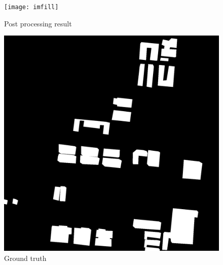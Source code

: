 \documentclass[]{IEEEtran}
\begin{document}
\begin{figure}
	\begin{minipage}[t]{0.5\linewidth}
		\centering
		\texttt{[image: imfill]}
		\caption{Post processing result}
		\label{fig:imfill}
	\end{minipage}%
	\begin{minipage}[t]{0.5\linewidth}
		\centering
		\includegraphics[width=0.9\columnwidth]{rs}
		\caption{Ground truth}
		\label{fig:gt}
	\end{minipage}
\end{figure}




\end{document}
